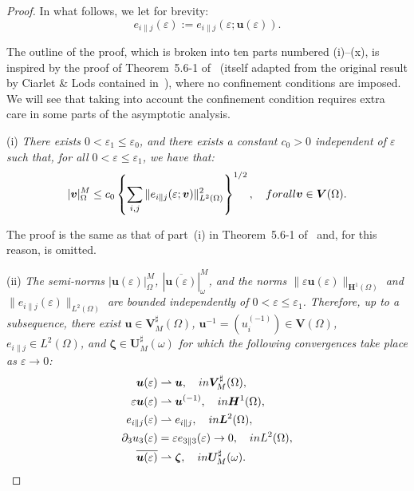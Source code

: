 \documentclass{amsart}
\begin{document}
\begin{proof}
In what follows, we let for brevity:
$$
e_{i\|j}(\varepsilon):=e_{i\|j}(\varepsilon;\bm{u}(\varepsilon)).
$$

The outline of the proof, which is broken into ten parts numbered (i)--(x), is inspired by the proof of Theorem~5.6-1 of~\cite{Ciarlet2000} (itself adapted from the original result by Ciarlet \& Lods contained in~\cite{CiaLods1996d}), where no confinement conditions are imposed. We will see that taking into account the confinement condition requires extra care in some parts of the asymptotic analysis.

(i) \emph{There exists $0<\varepsilon_1 \le \varepsilon_0$, and there exists a constant $c_0>0$ independent of $\varepsilon$ such that, for all $0<\varepsilon\le\varepsilon_1$, we have that:
\begin{equation*}
	|\bm{v}|_\Omega^M \le c_0 \left\{\sum_{i,j}\|e_{i\|j}(\varepsilon;\bm{v})\|_{L^2(\Omega)}^2\right\}^{1/2},\quad\textup{ for all }\bm{v} \in \bm{V}(\Omega).
\end{equation*}
}

The proof is the same as that of part~(i) in Theorem~5.6-1 of~\cite{Ciarlet2000} and, for this reason, is omitted.

(ii) \emph{The semi-norms $|\bm{u}(\varepsilon)|_\Omega^M$, $\left|\overline{\bm{u}(\varepsilon)}\right|_\omega^M$, and the norms $\|\varepsilon\bm{u}(\varepsilon)\|_{\bm{H}^1(\Omega)}$ and $\|e_{i\|j}(\varepsilon)\|_{L^2(\Omega)}$ are bounded independently of $0<\varepsilon\le\varepsilon_1$. Therefore, up to a subsequence, there exist $\bm{u}\in\bm{V}_M^\sharp(\Omega)$, $\bm{u}^{-1}=(u_i^{(-1)}) \in \bm{V}(\Omega)$, $e_{i\|j} \in L^2(\Omega)$, and $\bm{\zeta} \in \bm{U}_M^\sharp(\omega)$ for which the following convergences take place as $\varepsilon\to0$:
\begin{equation*}
	\begin{aligned}
		\bm{u}(\varepsilon) &\rightharpoonup \bm{u},\quad\textup{ in } \bm{V}_M^\sharp(\Omega),\\
		\varepsilon\bm{u}(\varepsilon) &\rightharpoonup \bm{u}^{(-1)},\quad\textup{ in } \bm{H}^1(\Omega),\\
		e_{i\|j}(\varepsilon) &\rightharpoonup e_{i\|j},\quad\textup{ in } \bm{L}^2(\Omega),\\
		\partial_3 u_3(\varepsilon) &=\varepsilon e_{3\|3}(\varepsilon) \to 0,\quad\textup{ in } L^2(\Omega),\\
		\overline{\bm{u}(\varepsilon)} &\rightharpoonup \bm{\zeta},\quad\textup{ in }\bm{U}_M^\sharp(\omega).
	\end{aligned}
\end{equation*}
}


\end{proof}
\end{document}
